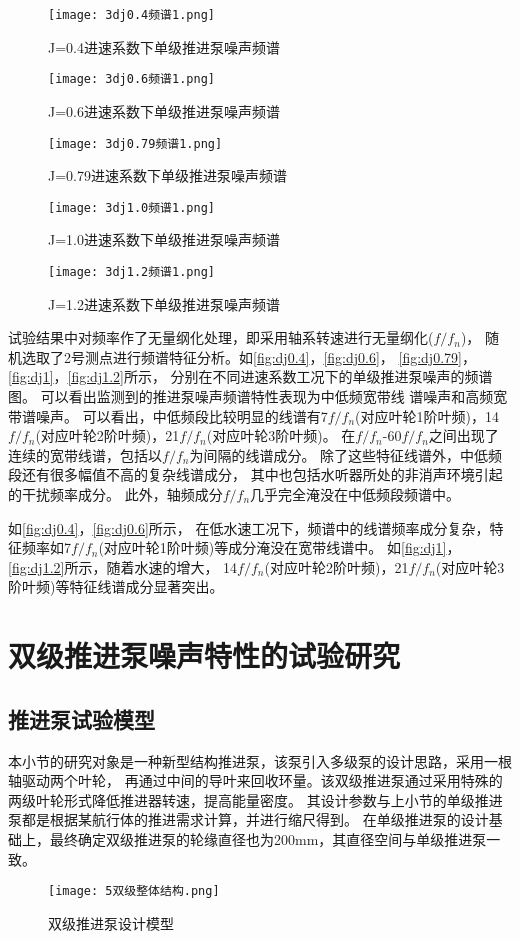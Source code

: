 \begin{figure}[htbp]
    \centering
    \texttt{[image: 3dj0.4频谱1.png]}
    \caption{\label{fig:dj0.4}J=0.4进速系数下单级推进泵噪声频谱}
\end{figure}
\begin{figure}[htbp]
    \centering
    \texttt{[image: 3dj0.6频谱1.png]}
    \caption{\label{fig:dj0.6}J=0.6进速系数下单级推进泵噪声频谱}
\end{figure}
\begin{figure}[htbp]
    \centering
    \texttt{[image: 3dj0.79频谱1.png]}
    \caption{\label{fig:dj0.79}J=0.79进速系数下单级推进泵噪声频谱}
\end{figure}
\begin{figure}[htbp]
    \centering
    \texttt{[image: 3dj1.0频谱1.png]}
    \caption{\label{fig:dj1}J=1.0进速系数下单级推进泵噪声频谱}
\end{figure}
\begin{figure}[htbp]
    \centering
    \texttt{[image: 3dj1.2频谱1.png]}
    \caption{\label{fig:dj1.2}J=1.2进速系数下单级推进泵噪声频谱}
\end{figure}

试验结果中对频率作了无量纲化处理，即采用轴系转速进行无量纲化($f/f_n$)，
随机选取了2号测点进行频谱特征分析。如\autoref{fig:dj0.4}，\autoref{fig:dj0.6}，
\autoref{fig:dj0.79}，\autoref{fig:dj1}，\autoref{fig:dj1.2}所示，
分别在不同进速系数工况下的单级推进泵噪声的频谱图。
可以看出监测到的推进泵噪声频谱特性表现为中低频宽带线
谱噪声和高频宽带谱噪声。
可以看出，中低频段比较明显的线谱有7$f/f_n$(对应叶轮1阶叶频)，14$f/f_n$(对应叶轮2阶叶频)，21$f/f_n$(对应叶轮3阶叶频)。
在$f/f_n$-60$f/f_n$之间出现了连续的宽带线谱，包括以$f/f_n$为间隔的线谱成分。
除了这些特征线谱外，中低频段还有很多幅值不高的复杂线谱成分，
其中也包括水听器所处的非消声环境引起的干扰频率成分。
此外，轴频成分$f/f_n$几乎完全淹没在中低频段频谱中。

如\autoref{fig:dj0.4}，\autoref{fig:dj0.6}所示，
在低水速工况下，频谱中的线谱频率成分复杂，特征频率如7$f/f_n$(对应叶轮1阶叶频)等成分淹没在宽带线谱中。
如\autoref{fig:dj1}，\autoref{fig:dj1.2}所示，随着水速的增大，
14$f/f_n$(对应叶轮2阶叶频)，21$f/f_n$(对应叶轮3阶叶频)等特征线谱成分显著突出。
\section{双级推进泵噪声特性的试验研究}
\subsection{推进泵试验模型}
本小节的研究对象是一种新型结构推进泵，该泵引入多级泵的设计思路，采用一根轴驱动两个叶轮，
再通过中间的导叶来回收环量。该双级推进泵通过采用特殊的两级叶轮形式降低推进器转速，提高能量密度。
其设计参数与上小节的单级推进泵都是根据某航行体的推进需求计算，并进行缩尺得到。
在单级推进泵的设计基础上，最终确定双级推进泵的轮缘直径也为200mm，其直径空间与单级推进泵一致。
\begin{figure}[htbp]
    \centering
    \texttt{[image: 5双级整体结构.png]}
    \caption{\label{fig:sj_modle}双级推进泵设计模型}
\end{figure}


